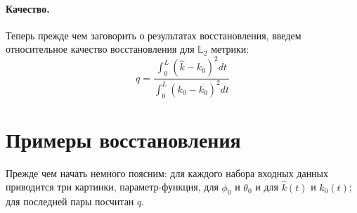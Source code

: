\documentclass[12pt]{article}
\begin{document}
\paragraph{Качество.} Теперь прежде чем заговорить о результатах восстановления, введем относительное качество восстановления для $\mathbb{L}_2$ метрики:
\[
q=\frac{\int_0^L (\hat{k}-k_0)^2 dt}{\int_0^L (k_0-\overline{k_0})^2 dt}
\]

\section{Примеры восстановления}
Прежде чем начать немного поясним: для каждого набора входных данных приводится три картинки, параметр-функция, для $\phi_0$ и $\theta_0$ и для $\hat{k}(t)$ и $k_0(t)$; для последней пары посчитан $q$.
\end{document}
